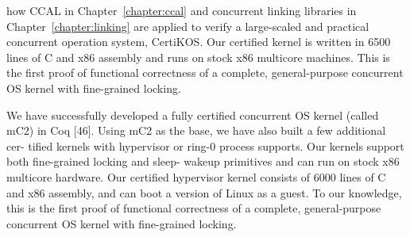 
how CCAL in Chapter~\ref{chapter:ccal} and concurrent linking libraries in Chapter~\ref{chapter:linking} are applied 
to verify a large-scaled and practical concurrent operation system, CertiKOS.
Our certified kernel is written in 6500 lines of C and x86 assembly
and runs on stock x86 multicore machines. This is
the first proof of functional correctness of a complete,
general-purpose concurrent OS kernel with fine-grained locking.


We have successfully developed a fully certified concurrent OS kernel (called mC2) in Coq [46]. Using mC2 as the base, we have also built a few additional cer- tified kernels with hypervisor or ring-0 process supports. Our kernels support both fine-grained locking and sleep- wakeup primitives and can run on stock x86 multicore hardware. Our certified hypervisor kernel consists of 6000 lines of C and x86 assembly, and can boot a version of Linux as a guest. To our knowledge, this is the first proof of functional correctness of a complete, general-purpose concurrent OS kernel with fine-grained locking.
